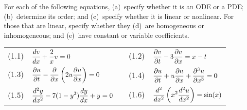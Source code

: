 For each of the following equations, 
(a)~specify whether it is an ODE or a PDE; 
(b)~determine its order; and
(c)~specify whether it is linear or nonlinear.
For those that are linear, specify whether they 
(d)~are homogeneous or inhomogeneous; and 
(e)~have constant or variable coefficients.
\begin{center} \begin{tabular}{lcl}
(1.1)\ \  $\displaystyle {d v \over d x} + {2 \over x} v = 0$ 
& &
(1.2)\ \ $\displaystyle {\partial v \over \partial t} 
                     - 3 {\partial v \over \partial x}  = x-t $\\[2em]
(1.3)\ \  $\displaystyle {\partial u \over \partial t} 
                      - {\partial \over \partial x} 
                         \left( 2 u {\partial u \over \partial x}\right) = 0 $
& &
(1.4)\ \  $\displaystyle {\partial u \over \partial t} 
                   + u {\partial u \over \partial x} 
                   + {\partial^3 u \over \partial x^3} = 0$ \\[2em]  %
(1.5)\ \  $\displaystyle {d^2 y \over dx^2 } 
                   -7 (1-y^2) {d y \over d x} + y 
                   = 0$   %
& &
(1.6)\ \  $\displaystyle {d^2 \over dx^2} \left( x^2 {d^2 u \over d x^2}\right) 
                    = \sin(x)$  
\end{tabular}\end{center}


